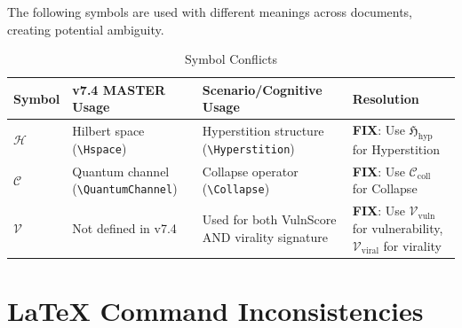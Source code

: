 \documentclass[11pt]{article}
\begin{document}
\begin{tcolorbox}[colback=red!5!white,colframe=red!75!black,title=\textbf{Critical Conflicts Requiring Resolution}]
The following symbols are used with different meanings across documents, creating potential ambiguity.
\end{tcolorbox}

\begin{longtable}{L{2cm}|L{4cm}|L{4cm}|L{4cm}}
\caption{Symbol Conflicts} \\
\toprule
\textbf{Symbol} & \textbf{v7.4 MASTER Usage} & \textbf{Scenario/Cognitive Usage} & \textbf{Resolution} \\
\midrule
\endfirsthead
\midrule
\endhead
\bottomrule
\endlastfoot

$\mathcal{H}$
& Hilbert space (\verb|\Hspace|)
& Hyperstition structure (\verb|\Hyperstition|)
& \textbf{FIX}: Use $\mathfrak{H}_{\mathrm{hyp}}$ for Hyperstition \\

\midrule
$\mathcal{C}$
& Quantum channel (\verb|\QuantumChannel|)
& Collapse operator (\verb|\Collapse|)
& \textbf{FIX}: Use $\mathcal{C}_{\mathrm{coll}}$ for Collapse \\

\midrule
$\mathcal{V}$
& Not defined in v7.4
& Used for both VulnScore AND virality signature
& \textbf{FIX}: Use $\mathcal{V}_{\mathrm{vuln}}$ for vulnerability, $\mathcal{V}_{\mathrm{viral}}$ for virality \\

\end{longtable}

\section{LaTeX Command Inconsistencies}
\end{document}
